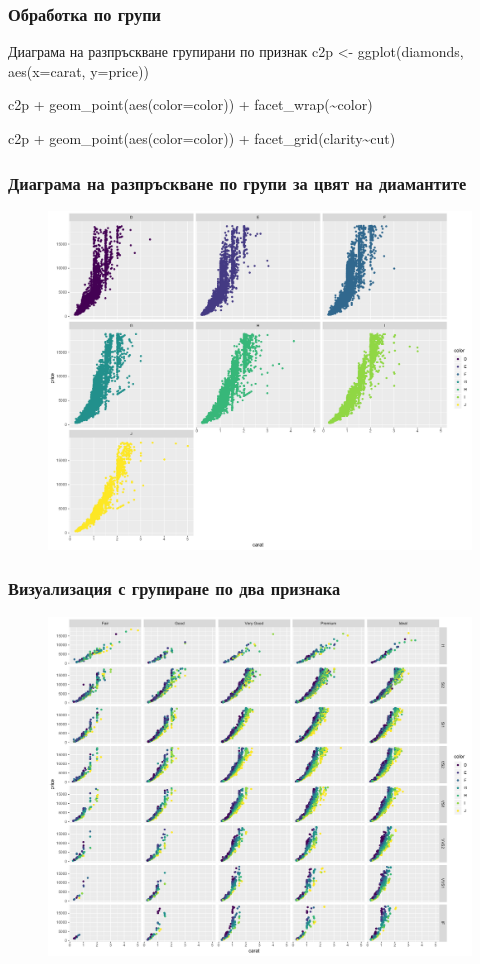 \documentclass{beamer}
\begin{document}
\begin{frame}
\frametitle{Обработка по групи}
\begin{block}{Диаграма на разпръскване групирани по признак}
c2p <- ggplot(diamonds, aes(x=carat, y=price))

c2p + geom\_point(aes(color=color)) + facet\_wrap(\textasciitilde color)

c2p + geom\_point(aes(color=color)) + facet\_grid(clarity\textasciitilde cut)
\end{block}
\end{frame}

\begin{frame}
\frametitle{Диаграма на разпръскване по групи за цвят на диамантите}
\begin{figure}[]\includegraphics[width=\textwidth,height=0.75\textheight]{pic0034}\end{figure}
\end{frame}

\begin{frame}
\frametitle{Визуализация с групиране по два признака}
\begin{figure}[]\includegraphics[width=\textwidth,height=0.75\textheight]{pic0035}\end{figure}
\end{frame}
\end{document}
